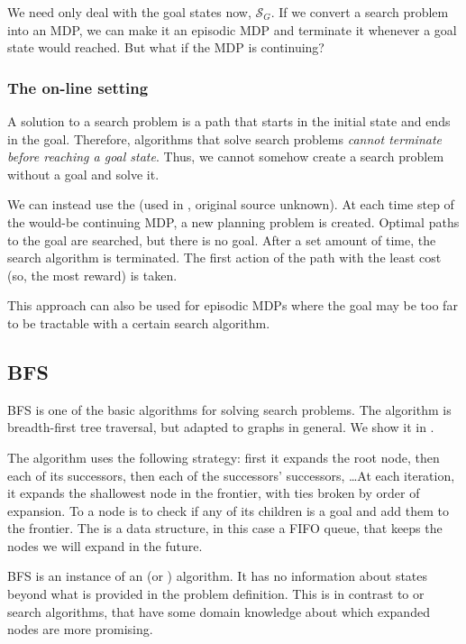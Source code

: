 We need only deal with the goal states now, $\mathcal{S}_G$. If we convert a
search problem into an \ac{MDP}, we can make it an episodic \ac{MDP} and
terminate it whenever a goal state would reached. But what if the \ac{MDP} is
continuing?

\subsubsection{The on-line setting\label{subsec:online-setting}}
A solution to a search problem is a path that starts in the initial state and
ends in the goal. Therefore, algorithms that solve search problems \emph{cannot
terminate before reaching a goal state}. Thus, we cannot somehow create a search
problem without a goal and solve it.

We can instead use the 
(used in \citet{lipovetzky2015classical}, original source unknown). At each time
step of the would-be continuing \ac{MDP}, a new planning problem is created.
Optimal paths to the goal are searched, but there is no goal. After a set amount
of time, the search algorithm is terminated. The first action of the path with
the least cost (so, the most reward) is taken.

This approach can also be used for episodic \acp{MDP} where the goal may be too
far to be tractable with a certain search algorithm.

\subsection{\acl{BFS}}
\acf{BFS} is one of the basic algorithms for solving search problems.
The algorithm is breadth-first tree traversal, but adapted to graphs
in general. We show it in .

The algorithm uses the following strategy: first it expands the root node, then
each of its successors, then each of the successors' successors, \dots At each
iteration, it expands the shallowest node in the frontier, with ties broken
by order of expansion. To  a node is to check if any of
its children is a goal and add them to the frontier. The 
is a data structure, in this case a \ac{FIFO} queue, that keeps the nodes we
will expand in the future.

\ac{BFS} is an instance of an  (or
) algorithm. It has no information about states beyond
what is provided in the problem definition. This is in contrast to
 or  search algorithms, that have
some domain knowledge about which expanded nodes are more promising.

